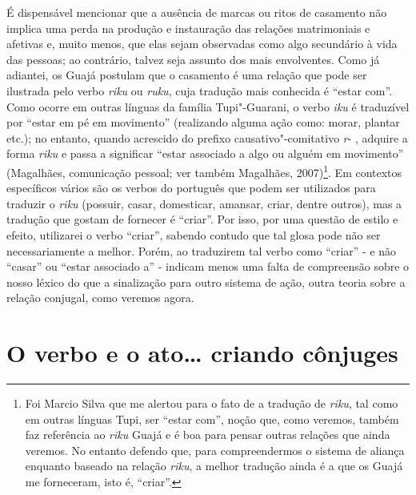É dispensável mencionar que a ausência de marcas ou ritos de casamento
não implica uma perda na produção e instauração das relações
matrimoniais e afetivas e, muito menos, que elas sejam observadas como
algo secundário à vida das pessoas; ao contrário, talvez seja assunto
dos mais envolventes. Como já adiantei, os Guajá postulam que o
casamento é uma relação que pode ser ilustrada pelo verbo \emph{riku} ou
\emph{ruku}, cuja tradução mais conhecida é ``estar com''. Como ocorre em
outras línguas da família Tupi"-Guarani, o verbo \emph{iku} é traduzível
por ``estar em pé em movimento'' (realizando alguma ação como: morar,
plantar etc.); no entanto, quando acrescido do prefixo
causativo"-comitativo \emph{r}- , adquire a forma \emph{riku} e passa a
significar ``estar associado a algo ou alguém em movimento'' (Magalhães,
comunicação pessoal; ver também Magalhães, 2007)\footnote{Foi Marcio
  Silva que me alertou para o fato de a tradução de \emph{riku}, tal
  como em outras línguas Tupi, ser ``{estar com}'', noção que, como
  veremos, também faz referência ao \emph{riku} Guajá e é boa para
  pensar outras relações que ainda veremos. No entanto defendo que, para
  compreendermos o sistema de aliança enquanto baseado na relação
  \emph{riku}, a melhor tradução ainda é a que os Guajá me forneceram,
  isto é, ``{criar}''.}. Em contextos específicos vários são os verbos do
português que podem ser utilizados para traduzir o \emph{riku} (possuir,
casar, domesticar, amansar, criar, dentre outros), mas a tradução que
gostam de fornecer é ``criar''. Por isso, por uma questão de estilo e
efeito, utilizarei o verbo ``criar'', sabendo contudo que tal glosa pode
não ser necessariamente a melhor. Porém, ao traduzirem tal verbo como
``criar'' - e não ``casar'' ou ``estar associado a'' - indicam menos uma falta
de compreensão sobre o nosso léxico do que a sinalização para outro
sistema de ação, outra teoria sobre a relação conjugal, como veremos
agora.

\section{O verbo e o ato\ldots{} criando
cônjuges}

